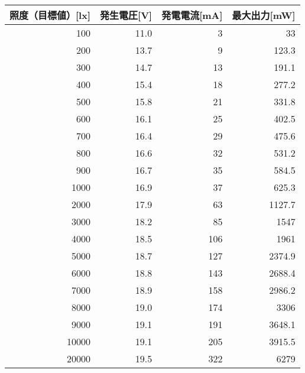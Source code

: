 \begin{tabular}{rrrr}
  \toprule
  \multicolumn{1}{c}{照度（目標値）[lx]} & \multicolumn{1}{l}{発生電圧[V]} & \multicolumn{1}{l}{発電電流[mA]} & \multicolumn{1}{l}{最大出力[mW]} \\
  \midrule
  100   & 11.0  & 3     & 33 \\
  200   & 13.7  & 9     & 123.3 \\
  300   & 14.7  & 13    & 191.1 \\
  400   & 15.4  & 18    & 277.2 \\
  500   & 15.8  & 21    & 331.8 \\
  600   & 16.1  & 25    & 402.5 \\
  700   & 16.4  & 29    & 475.6 \\
  800   & 16.6  & 32    & 531.2 \\
  900   & 16.7  & 35    & 584.5 \\
  1000  & 16.9  & 37    & 625.3 \\
  2000  & 17.9  & 63    & 1127.7 \\
  3000  & 18.2  & 85    & 1547 \\
  4000  & 18.5  & 106   & 1961 \\
  5000  & 18.7  & 127   & 2374.9 \\
  6000  & 18.8  & 143   & 2688.4 \\
  7000  & 18.9  & 158   & 2986.2 \\
  8000  & 19.0  & 174   & 3306 \\
  9000  & 19.1  & 191   & 3648.1 \\
  10000 & 19.1  & 205   & 3915.5 \\
  20000 & 19.5  & 322   & 6279 \\
  \bottomrule
\end{tabular}